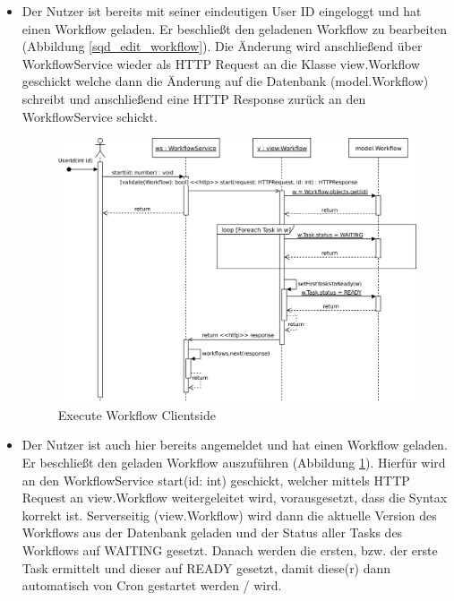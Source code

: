 \begin{itemize}
    \item Der Nutzer ist bereits mit seiner eindeutigen User ID eingeloggt und hat einen Workflow geladen. Er beschließt den geladenen Workflow zu bearbeiten (Abbildung \ref{sqd_edit_workflow}). Die Änderung wird anschließend über WorkflowService wieder als HTTP Request an die Klasse view.Workflow geschickt welche dann die Änderung auf die Datenbank (model.Workflow) schreibt und anschließend eine HTTP Response zurück an den WorkflowService schickt.\newline\newline
    
    \begin{figure}[H]
        \centering
        \includegraphics[width=15cm]{images/sqd_execute_workflow_client.jpg}
        \caption{Execute Workflow Clientside}
        \label{sqd_execute_workflow_client}
    \end{figure}
    
    \item Der Nutzer ist auch hier bereits angemeldet und hat einen Workflow geladen. Er beschließt den geladen Workflow auszuführen (Abbildung \ref{sqd_execute_workflow_client}). Hierfür wird an den WorkflowService start(id: int) geschickt, welcher mittels HTTP Request an view.Workflow weitergeleitet wird, vorausgesetzt, dass die Syntax korrekt ist. Serverseitig (view.Workflow) wird dann die aktuelle Version des Workflows aus der Datenbank geladen und der Status aller Tasks des Workflows auf \grqq{}WAITING\grqq{}  gesetzt. Danach werden die ersten, bzw. der erste Task ermittelt und dieser auf \grqq{}READY\grqq{}  gesetzt, damit diese(r) dann automatisch von Cron gestartet werden / wird. \newline\newline
    

\end{itemize}
